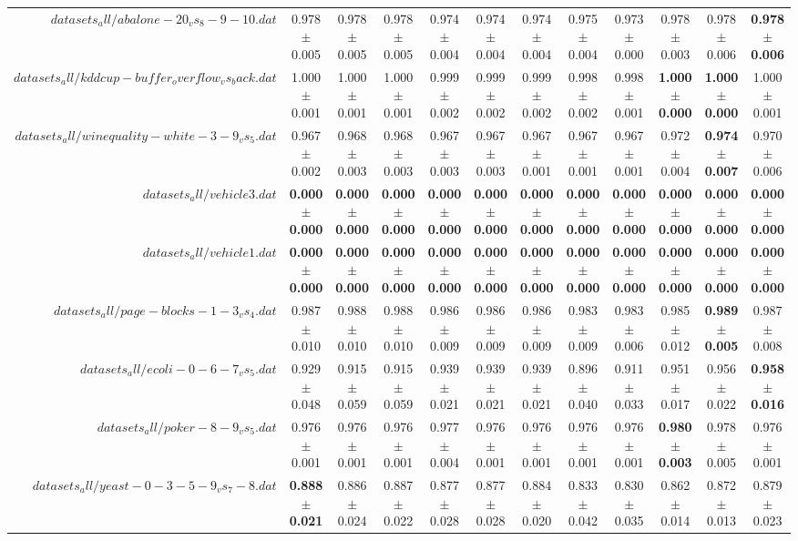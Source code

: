 \begin{table}[!ht]
{\begin{tabular}{r c c c c c c c c c c c}
$datasets_all/abalone-20_vs_8-9-10.dat$ & 0.978 $\pm$ 0.005 & 0.978 $\pm$ 0.005 & 0.978 $\pm$ 0.005 & 0.974 $\pm$ 0.004 & 0.974 $\pm$ 0.004 & 0.974 $\pm$ 0.004 & 0.975 $\pm$ 0.004 & 0.973 $\pm$ 0.000 & 0.978 $\pm$ 0.003 & 0.978 $\pm$ 0.006 & \textbf{0.978 $\pm$ 0.006} \\
$datasets_all/kddcup-buffer_overflow_vs_back.dat$ & 1.000 $\pm$ 0.001 & 1.000 $\pm$ 0.001 & 1.000 $\pm$ 0.001 & 0.999 $\pm$ 0.002 & 0.999 $\pm$ 0.002 & 0.999 $\pm$ 0.002 & 0.998 $\pm$ 0.002 & 0.998 $\pm$ 0.001 & \textbf{1.000 $\pm$ 0.000} & \textbf{1.000 $\pm$ 0.000} & 1.000 $\pm$ 0.001 \\
$datasets_all/winequality-white-3-9_vs_5.dat$ & 0.967 $\pm$ 0.002 & 0.968 $\pm$ 0.003 & 0.968 $\pm$ 0.003 & 0.967 $\pm$ 0.003 & 0.967 $\pm$ 0.003 & 0.967 $\pm$ 0.001 & 0.967 $\pm$ 0.001 & 0.967 $\pm$ 0.001 & 0.972 $\pm$ 0.004 & \textbf{0.974 $\pm$ 0.007} & 0.970 $\pm$ 0.006 \\
$datasets_all/vehicle3.dat$ & \textbf{0.000 $\pm$ 0.000} & \textbf{0.000 $\pm$ 0.000} & \textbf{0.000 $\pm$ 0.000} & \textbf{0.000 $\pm$ 0.000} & \textbf{0.000 $\pm$ 0.000} & \textbf{0.000 $\pm$ 0.000} & \textbf{0.000 $\pm$ 0.000} & \textbf{0.000 $\pm$ 0.000} & \textbf{0.000 $\pm$ 0.000} & \textbf{0.000 $\pm$ 0.000} & \textbf{0.000 $\pm$ 0.000} \\
$datasets_all/vehicle1.dat$ & \textbf{0.000 $\pm$ 0.000} & \textbf{0.000 $\pm$ 0.000} & \textbf{0.000 $\pm$ 0.000} & \textbf{0.000 $\pm$ 0.000} & \textbf{0.000 $\pm$ 0.000} & \textbf{0.000 $\pm$ 0.000} & \textbf{0.000 $\pm$ 0.000} & \textbf{0.000 $\pm$ 0.000} & \textbf{0.000 $\pm$ 0.000} & \textbf{0.000 $\pm$ 0.000} & \textbf{0.000 $\pm$ 0.000} \\
$datasets_all/page-blocks-1-3_vs_4.dat$ & 0.987 $\pm$ 0.010 & 0.988 $\pm$ 0.010 & 0.988 $\pm$ 0.010 & 0.986 $\pm$ 0.009 & 0.986 $\pm$ 0.009 & 0.986 $\pm$ 0.009 & 0.983 $\pm$ 0.009 & 0.983 $\pm$ 0.006 & 0.985 $\pm$ 0.012 & \textbf{0.989 $\pm$ 0.005} & 0.987 $\pm$ 0.008 \\
$datasets_all/ecoli-0-6-7_vs_5.dat$ & 0.929 $\pm$ 0.048 & 0.915 $\pm$ 0.059 & 0.915 $\pm$ 0.059 & 0.939 $\pm$ 0.021 & 0.939 $\pm$ 0.021 & 0.939 $\pm$ 0.021 & 0.896 $\pm$ 0.040 & 0.911 $\pm$ 0.033 & 0.951 $\pm$ 0.017 & 0.956 $\pm$ 0.022 & \textbf{0.958 $\pm$ 0.016} \\
$datasets_all/poker-8-9_vs_5.dat$ & 0.976 $\pm$ 0.001 & 0.976 $\pm$ 0.001 & 0.976 $\pm$ 0.001 & 0.977 $\pm$ 0.004 & 0.976 $\pm$ 0.001 & 0.976 $\pm$ 0.001 & 0.976 $\pm$ 0.001 & 0.976 $\pm$ 0.001 & \textbf{0.980 $\pm$ 0.003} & 0.978 $\pm$ 0.005 & 0.976 $\pm$ 0.001 \\
$datasets_all/yeast-0-3-5-9_vs_7-8.dat$ & \textbf{0.888 $\pm$ 0.021} & 0.886 $\pm$ 0.024 & 0.887 $\pm$ 0.022 & 0.877 $\pm$ 0.028 & 0.877 $\pm$ 0.028 & 0.884 $\pm$ 0.020 & 0.833 $\pm$ 0.042 & 0.830 $\pm$ 0.035 & 0.862 $\pm$ 0.014 & 0.872 $\pm$ 0.013 & 0.879 $\pm$ 0.023 \\
\end{tabular}}
\end{table}
